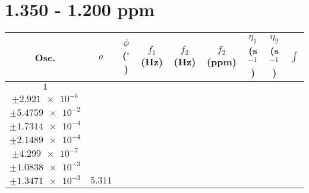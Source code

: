 \documentclass[8pt]{article}
\begin{document}
\section*{1.350 - 1.200 ppm}
\begin{longtable}[l]{c c c c c c c c c}
\toprule
Osc. & $a$ & $\phi$ ($^{\circ}$) & $f_1$ (Hz) & $f_2$ (Hz) & $f_2$ (ppm) & $\eta_1$ (s$^{-1}$) & $\eta_2$ (s$^{-1}$) & $\int$\\
\midrule
$\num{1}$ & \begin{tabular}[c]{@{}c@{}}$\num{3.0668e-2}$ \\ $\pm\num{2.921e-5}$\end{tabular} & \begin{tabular}[c]{@{}c@{}}$\num{-0.72639}$ \\ $\pm\num{5.4759e-2}$\end{tabular} & \begin{tabular}[c]{@{}c@{}}$\num{-8.501}$ \\ $\pm\num{1.7314e-4}$\end{tabular} & \begin{tabular}[c]{@{}c@{}}$\num{629.18}$ \\ $\pm\num{2.1489e-4}$\end{tabular} & \begin{tabular}[c]{@{}c@{}}$\num{1.2587}$ \\ $\pm\num{4.299e-7}$\end{tabular} & \begin{tabular}[c]{@{}c@{}}$\num{0.9546}$ \\ $\pm\num{1.0838e-3}$\end{tabular} & \begin{tabular}[c]{@{}c@{}}$\num{0.95209}$ \\ $\pm\num{1.3471e-3}$\end{tabular} & $\num{5.311}$\\

\end{longtable}
\end{document}
